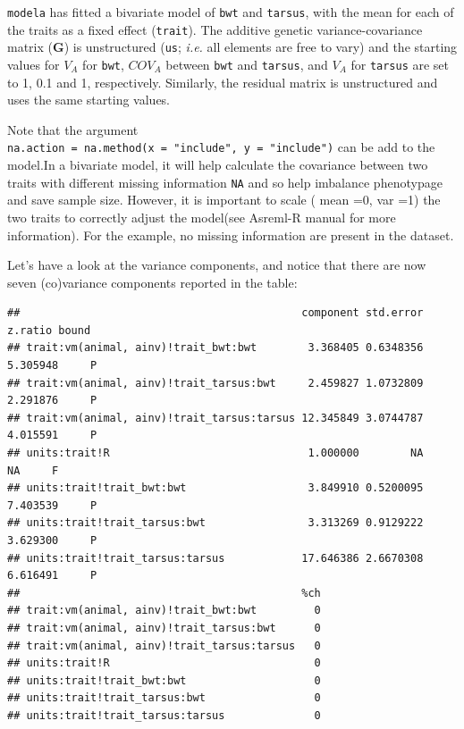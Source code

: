 \documentclass[
  12pt,
]{book}
\newenvironment{Shaded}{\begin{snugshade}}{\end{snugshade}}
\newcommand{\FunctionTok}[1]{\textcolor[rgb]{0.00,0.00,0.00}{#1}}
\newcommand{\NormalTok}[1]{#1}
\newcommand{\SpecialCharTok}[1]{\textcolor[rgb]{0.00,0.00,0.00}{#1}}
\begin{document}
\texttt{modela} has fitted a bivariate model of \texttt{bwt} and \texttt{tarsus}, with the mean for each of the traits as a fixed effect (\texttt{trait}). The additive genetic variance-covariance matrix (\(\textbf{G}\)) is unstructured (\texttt{us}; \emph{i.e.} all elements are free to vary) and the starting values for \(V_A\) for \texttt{bwt}, \(COV_A\) between \texttt{bwt} and \texttt{tarsus}, and \(V_A\) for \texttt{tarsus} are set to 1, 0.1 and 1, respectively. Similarly, the residual matrix is unstructured and uses the same starting values.

Note that the argument \texttt{na.action\ =\ na.method(x\ =\ "include",\ y\ =\ "include")} can be add to the model.In a bivariate model, it will help calculate the covariance between two traits with different missing information \texttt{NA} and so help imbalance phenotypage and save sample size. However, it is important to scale ( mean =0, var =1) the two traits to correctly adjust the model(see Asreml-R manual for more information).
For the example, no missing information are present in the dataset.

Let's have a look at the variance components, and notice that there are now seven (co)variance components reported in the table:

\begin{Shaded}
\end{Shaded}

\begin{verbatim}
##                                            component std.error  z.ratio bound
## trait:vm(animal, ainv)!trait_bwt:bwt        3.368405 0.6348356 5.305948     P
## trait:vm(animal, ainv)!trait_tarsus:bwt     2.459827 1.0732809 2.291876     P
## trait:vm(animal, ainv)!trait_tarsus:tarsus 12.345849 3.0744787 4.015591     P
## units:trait!R                               1.000000        NA       NA     F
## units:trait!trait_bwt:bwt                   3.849910 0.5200095 7.403539     P
## units:trait!trait_tarsus:bwt                3.313269 0.9129222 3.629300     P
## units:trait!trait_tarsus:tarsus            17.646386 2.6670308 6.616491     P
##                                            %ch
## trait:vm(animal, ainv)!trait_bwt:bwt         0
## trait:vm(animal, ainv)!trait_tarsus:bwt      0
## trait:vm(animal, ainv)!trait_tarsus:tarsus   0
## units:trait!R                                0
## units:trait!trait_bwt:bwt                    0
## units:trait!trait_tarsus:bwt                 0
## units:trait!trait_tarsus:tarsus              0
\end{verbatim}
\end{document}
